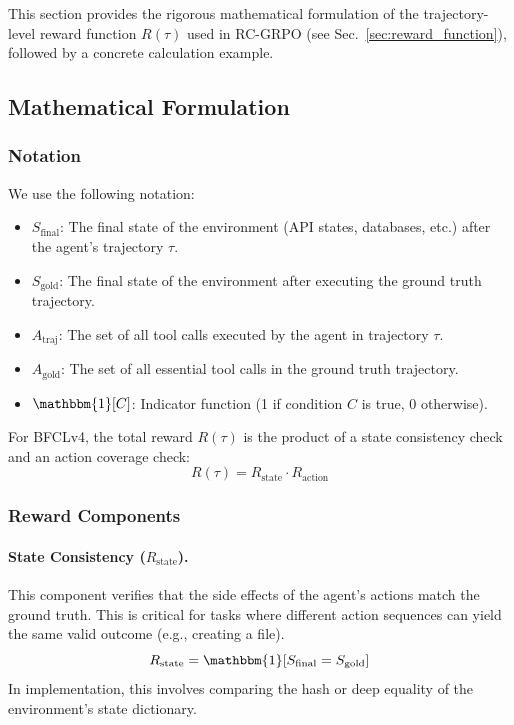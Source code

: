 \documentclass{article}
\theoremstyle{plain}
\theoremstyle{definition}
\theoremstyle{remark}
\begin{document}
This section provides the rigorous mathematical formulation of the trajectory-level reward function $R(\tau)$ used in RC-GRPO (see Sec.~\ref{sec:reward_function}), followed by a concrete calculation example.

\subsection{Mathematical Formulation}

\subsubsection{Notation}
We use the following notation:
\begin{itemize}
    \item $S_{\text{final}}$: The final state of the environment (API states, databases, etc.) after the agent's trajectory $\tau$.
    \item $S_{\text{gold}}$: The final state of the environment after executing the ground truth trajectory.
    \item $A_{\text{traj}}$: The set of all tool calls executed by the agent in trajectory $\tau$.
    \item $A_{\text{gold}}$: The set of all essential tool calls in the ground truth trajectory.
    \item $\mathbbm{1}[C]$: Indicator function (1 if condition $C$ is true, 0 otherwise).
\end{itemize}

For BFCLv4, the total reward $R(\tau)$ is the product of a state consistency check and an action coverage check:
\begin{equation}
    R(\tau) = R_{\text{state}} \cdot R_{\text{action}}
\end{equation}

\subsubsection{Reward Components}

\paragraph{State Consistency ($R_{\text{state}}$).}
This component verifies that the side effects of the agent's actions match the ground truth. This is critical for tasks where different action sequences can yield the same valid outcome (e.g., creating a file).
\begin{equation}
    R_{\text{state}} = \mathbbm{1}[S_{\text{final}} = S_{\text{gold}}]
\end{equation}
In implementation, this involves comparing the hash or deep equality of the environment's state dictionary.
\end{document}
